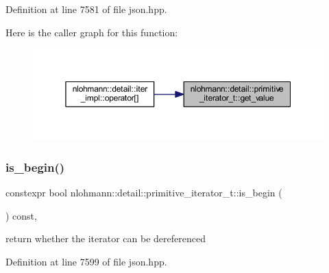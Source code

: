 Definition at line 7581 of file json.\+hpp.

Here is the caller graph for this function\+:
\nopagebreak
\begin{figure}[H]
\begin{center}
\leavevmode
\includegraphics[width=350pt]{classnlohmann_1_1detail_1_1primitive__iterator__t_ae952990886ca1756229f916661a8af81_icgraph}
\end{center}
\end{figure}
\mbox{\label{classnlohmann_1_1detail_1_1primitive__iterator__t_a8d1a7d46b3fcd06edd034f04ededb5e4}} 
\subsubsection{\texorpdfstring{is\_begin()}{is\_begin()}}
{\footnotesize\ttfamily constexpr bool nlohmann\+::detail\+::primitive\+\_\+iterator\+\_\+t\+::is\+\_\+begin (\begin{DoxyParamCaption}{ }\end{DoxyParamCaption}) const\hspace{0.3cm}{\ttfamily [inline]}, {\ttfamily [noexcept]}}



return whether the iterator can be dereferenced 



Definition at line 7599 of file json.\+hpp.

